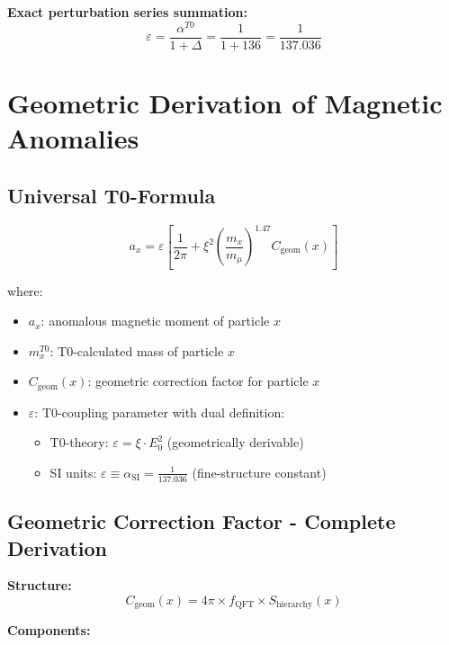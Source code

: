 \documentclass[12pt,a4paper]{article}
\numberwithin{equation}{section}
\newcommand{\xipar}{\xi}
\newcommand{\epsilonT}{\varepsilon}
\newcommand{\alphaSI}{\alpha_{\text{SI}}}
\newcommand{\alphaT}{\alpha^{T0}}
\newcommand{\Cgeom}{C_{\text{geom}}}
\newcommand{\fQFT}{f_{\text{QFT}}}
\newcommand{\Eo}{E_0}
\begin{document}
	\textbf{Exact perturbation series summation:}
	\begin{equation}
		\epsilonT = \frac{\alphaT}{1+\Delta} = \frac{1}{1+136} = \frac{1}{137.036}
		\label{eq:epsilon_renormalized}
	\end{equation}
	
	\section{Geometric Derivation of Magnetic Anomalies}
	
	\subsection{Universal T0-Formula}
	
	\begin{equation}
		a_x = \epsilonT \left[ \frac{1}{2\pi} + \xipar^2 \left(\frac{m_x}{m_\mu}\right)^{1.47} \Cgeom(x) \right]
		\label{eq:universal_formula}
	\end{equation}
	
	where:
	\begin{itemize}
		\item $a_x$: anomalous magnetic moment of particle $x$
		\item $m_x^{T0}$: T0-calculated mass of particle $x$
		\item $\Cgeom(x)$: geometric correction factor for particle $x$
		\item $\epsilonT$: T0-coupling parameter with dual definition:
		\begin{itemize}
			\item T0-theory: $\epsilonT = \xipar \cdot \Eo^2$ (geometrically derivable)
			\item SI units: $\epsilonT \equiv \alphaSI = \frac{1}{137.036}$ (fine-structure constant)
		\end{itemize}
	\end{itemize}
	
	\subsection{Geometric Correction Factor - Complete Derivation}
	
	\textbf{Structure:}
	\begin{equation}
		\Cgeom(x) = 4\pi \times \fQFT \times S_{\text{hierarchy}}(x)
		\label{eq:cgeom_structure}
	\end{equation}
	
	\textbf{Components:}
	
\end{document}
